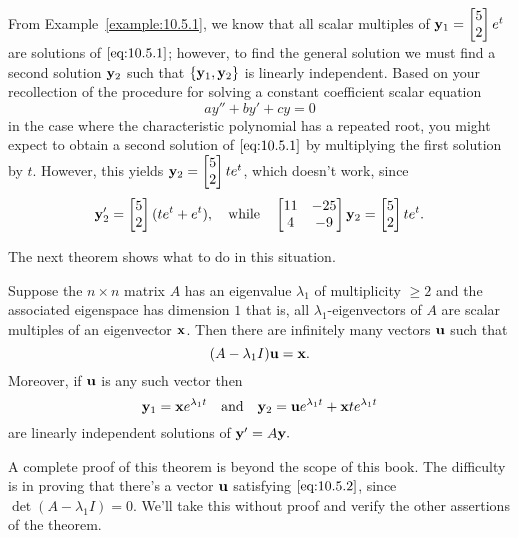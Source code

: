 \documentclass{ximera}
\begin{document}
From Example~\ref{example:10.5.1}, we know that all scalar multiples of
${\bf y}_1=\begin{bmatrix}5\\2\end{bmatrix}e^t$ are solutions of $\eqref{eq:10.5.1}$;
however,
to find the general solution we must find a second solution ${\bf
y}_2$ such that $\{{\bf y}_1,{\bf y}_2\}$ is linearly independent.
Based on your recollection of the procedure for solving a constant
coefficient scalar equation
$$
ay''+by'+cy=0
$$
in the case where the characteristic polynomial has a repeated root,
you might expect to obtain a second solution of $\eqref{eq:10.5.1}$ by
multiplying the first solution by $t$. However, this yields ${\bf
y}_2=\begin{bmatrix}5\\2\end{bmatrix}te^t$, which doesn't work, since
$$
{\bf y}_2'=\begin{bmatrix}5\\2\end{bmatrix}(te^t+e^t),\quad\mbox{while}\quad
\begin{bmatrix}11&-25\\4&-9\end{bmatrix}{\bf y}_2=\begin{bmatrix}5\\2\end{bmatrix}te^t.
$$

The next theorem shows what to do in this situation.

\begin{theorem}\label{thmtype:10.5.1}
Suppose the $n\times n$ matrix $A$ has an eigenvalue $\lambda_1$
of multiplicity $\geq 2$ and the associated eigenspace has dimension
$1$ that is, all $\lambda_1$-eigenvectors of $A$ are scalar
multiples
of  an eigenvector ${\bf x}$.  Then there are infinitely many vectors
${\bf u}$ such that
\begin{equation}\label{eq:10.5.2}
(A-\lambda_1I){\bf u}={\bf x}.
\end{equation}
Moreover, if ${\bf u}$ is any such vector  then
\begin{equation}\label{eq:10.5.3}
{\bf y}_1={\bf x}e^{\lambda_1t}\quad\mbox{and}\quad
{\bf y}_2={\bf u}e^{\lambda_1t}+{\bf x}te^{\lambda_1t}
\end{equation}
are linearly independent  solutions of ${\bf y}'=A{\bf y}.$
\end{theorem}

A complete proof of this theorem is beyond the scope of this book. The
difficulty is in proving that there's a vector ${\bf u}$ satisfying
$\eqref{eq:10.5.2}$, since $\det(A-\lambda_1I)=0$. We'll take this without
proof and verify the other assertions of the theorem.
\end{document}
